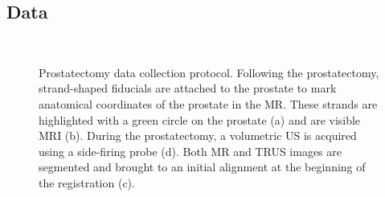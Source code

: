 \documentclass[journal]{IEEEtran}
\begin{document}
\subsection{Data}\label{sec:data}
\begin{figure}[t]
	\centering
	\\
\caption{Prostatectomy data collection protocol. Following the prostatectomy, strand-shaped fiducials are attached to the prostate to mark anatomical coordinates of the prostate in the MR. These strands are highlighted with a green circle on the prostate (a) and are visible MRI (b). During the prostatectomy, a volumetric US is acquired using a side-firing probe (d). Both MR and TRUS images are segmented and brought to an initial alignment at the beginning of the registration (c). \label{fig:prostatectomyData}}
\end{figure}
\end{document}
